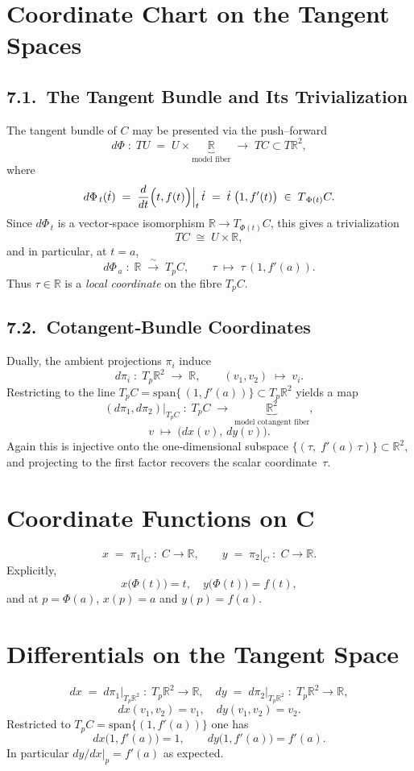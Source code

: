 \documentclass[12pt]{article}
\numberwithin{equation}{section}
\theoremstyle{definitionstyle}
\newcommand{\R}{\mathbb{R}}
\begin{document}
	\section{Coordinate Chart on the Tangent Spaces}
	
	\subsection*{7.1.\ The Tangent Bundle and Its Trivialization}
	
	The tangent bundle of $C$ may be presented via the push–forward
	\[
	d\Phi\;:\;
	TU\;=\;U\times\underbrace{\R}_{\text{model fiber}}
	\;\longrightarrow\;TC\subset T\R^2,
	\]
	where
	\[
	d\Phi_{\,t}(\dot t)
	\;=\;
	\frac{d}{dt}\Bigl(t,f(t)\Bigr)\Big|_{t}\,\dot t
	\;=\;
	\dot t\;\bigl(1,f'(t)\bigr)
	\;\in\;T_{\,\Phi(t)}C.
	\]
	Since $d\Phi_{\,t}$ is a vector‐space isomorphism $\R\to T_{\Phi(t)}C$, this gives a trivialization
	\[
	TC \;\cong\; U\times\R,
	\]
	and in particular, at $t=a$,
	\[
	d\Phi_{\,a}\;:\;
	\R\;\xrightarrow{\;\sim\;}\;T_{p}C,
	\qquad
	\tau\;\longmapsto\;\tau\,(1,f'(a)).
	\]
	Thus \(\tau\in\R\) is a \emph{local coordinate} on the fibre \(T_pC\).
	
	\subsection*{7.2.\ Cotangent‐Bundle Coordinates}
	
	Dually, the ambient projections $\pi_i$ induce
	\[
	d\pi_i\;:\;
	T_{p}\R^2\;\longrightarrow\;\R,
	\qquad
	(v_1,v_2)\;\longmapsto\;v_i.
	\]
	Restricting to the line $T_pC=\mathrm{span}\{\,(1,f'(a))\}\subset T_p\R^2$ yields a map
	\[
	(d\pi_1,d\pi_2)\bigl|_{T_pC}
	\;:\;
	T_pC
	\;\longrightarrow\;
	\underbrace{\R^2}_{\displaystyle \text{model cotangent fiber}},
	\]
	\[
	v\;\longmapsto\;\bigl(dx(v),\,dy(v)\bigr).
	\]
	Again this is injective onto the one‐dimensional subspace $\{(\tau,\;f'(a)\,\tau)\}\subset\R^2$, and projecting to the first factor recovers the scalar coordinate~$\tau$.
	
	\section{Coordinate Functions on \(\mathbf{C}\)}
	
	\[
	x\;=\;\pi_1\bigl|_C\;:\;C\longrightarrow\R,
	\qquad
	y\;=\;\pi_2\bigl|_C\;:\;C\longrightarrow\R.
	\]
	Explicitly,
	\[
	x\bigl(\Phi(t)\bigr)=t,
	\quad
	y\bigl(\Phi(t)\bigr)=f(t),
	\]
	and at $p=\Phi(a)$, $x(p)=a$ and $y(p)=f(a)$.
	
	\section{Differentials on the Tangent Space}
	
	\[
	dx\;=\;d\pi_1\bigl|_{T_p\R^2}\;:\;T_p\R^2\to\R,
	\quad
	dy\;=\;d\pi_2\bigl|_{T_p\R^2}\;:\;T_p\R^2\to\R,
	\]
	\[
	dx(v_1,v_2)=v_1,\quad dy(v_1,v_2)=v_2.
	\]
	Restricted to $T_pC=\mathrm{span}\{(1,f'(a))\}$ one has
	\[
	dx\bigl(1,f'(a)\bigr)=1,
	\qquad
	dy\bigl(1,f'(a)\bigr)=f'(a).
	\]
	In particular $dy/dx\big|_p=f'(a)$ as expected.
	
\end{document}
